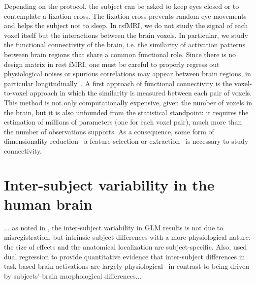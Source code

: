 Depending on the protocol, the subject can be asked to keep eyes closed or
to contemplate a fixation cross. The fixation cross prevents random eye movements
and helps the subject not to sleep.
In rsfMRI, we do not study the signal of each voxel itself but the
interactions between the brain voxels. In particular, we study the functional
connectivity of the brain, i.e. the similarity of activation patterns between
brain regions that share a common functional role. Since there is no design
matrix in rest fMRI, one must be careful to properly regress out physiological
noises or spurious correlations may appear between brain regions, in particular
longitudinally~\citep{power2012,vandijk2012}.
A first approach of functional connectivity is the voxel-to-voxel approach in
which the similarity is measured between each pair of voxels. This method is
not only computationally expensive, given the number of voxels in the brain,
but it is also unfounded from the statistical standpoint: it requires the
estimation of millions of parameters (one for each voxel pair), much more than the number of observations
supports. As a consequence, some form of dimensionality reduction --a feature
selection or extraction-- is necessary to study connectivity.



\section{Inter-subject variability in the human brain}
... as noted in
\citep{thirion2007analysis,pmid22425669}, the inter-subject variability
in GLM results is not due to misregistration, but intrinsic subject
differences with a more physiological nature: the size of effects and
the anatomical localization are subject-specific. Also, \citep{tavor2016task} used
dual regression \citep{Filippini2009} to provide quantitative evidence that inter-subject
differences in task-based brain activations are largely physiological --in contrast to being driven
by subjects' brain morphological differences...




